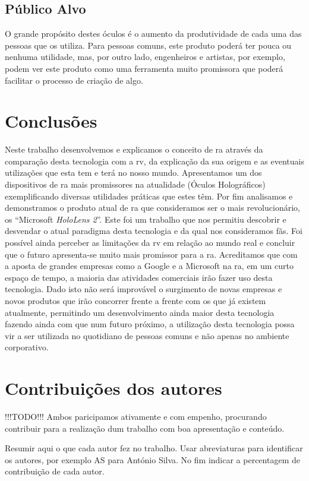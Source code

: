 \documentclass{report}
\begin{document}
\section{Público Alvo}
O grande propósito destes óculos é o aumento da produtividade de cada uma das pessoas que os utiliza.
Para pessoas comuns, este produto poderá ter pouca ou nenhuma utilidade, mas, por outro lado, engenheiros e artistas, por exemplo, podem ver este produto como uma ferramenta muito promissora que poderá facilitar o processo de criação de algo.

\chapter{Conclusões}
\label{chap.conclusao}
Neste trabalho desenvolvemos e explicamos o conceito de \ac{ra} através da comparação desta tecnologia com a \ac{rv}, da explicação da sua origem e as eventuais utilizações que esta tem e terá no nosso mundo. Apresentamos um dos dispositivos de \ac{ra} mais promissores na atualidade (Óculos Holográficos) exemplificando diversas utilidades práticas que estes têm. Por fim analisamos e demonstramos o produto atual de \ac{ra} que consideramos ser o mais revolucionário, os “Microsoft \textit{HoloLens 2}”. Este foi um trabalho que nos permitiu descobrir e desvendar o atual paradigma desta tecnologia e da qual nos consideramos fãs. Foi possível ainda perceber as limitações da \ac{rv} em relação ao mundo real e concluir que o futuro apresenta-se muito mais promissor para a \ac{ra}. Acreditamos que com a aposta de grandes empresas como a Google e a Microsoft na \ac{ra}, em um curto espaço de tempo, a maioria das atividades comerciais irão fazer uso desta tecnologia. Dado isto não será improvável o surgimento de novas empresas e novos produtos que irão concorrer frente a frente com os que já existem atualmente, permitindo um desenvolvimento ainda maior desta tecnologia fazendo ainda com que num futuro próximo, a utilização desta tecnologia possa vir a ser utilizada no quotidiano de pessoas comuns e não apenas no ambiente corporativo.

\chapter*{Contribuições dos autores}
!!!TODO!!! Ambos paricipamos ativamente e com empenho, procurando contribuir para a realização dum trabalho com boa apresentação e conteúdo.

Resumir aqui o que cada autor fez no trabalho. Usar abreviaturas para identificar os autores, por exemplo AS para António Silva. No fim indicar a percentagem de contribuição de cada autor.
\end{document}
